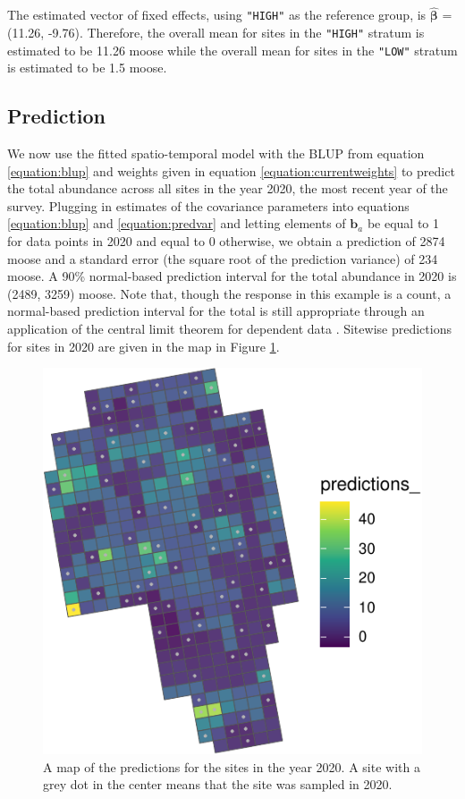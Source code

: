 \documentclass[]{interact}
\theoremstyle{plain}%
\theoremstyle{definition}
\theoremstyle{remark}
\begin{document}
The estimated vector of fixed effects, using \texttt{"HIGH"} as the
reference group, is \(\bm{\hat{\beta}}\) = (11.26, -9.76). Therefore,
the overall mean for sites in the \texttt{"HIGH"} stratum is estimated
to be 11.26 moose while the overall mean for sites in the \texttt{"LOW"}
stratum is estimated to be 1.5 moose.

\subsection{Prediction}

We now use the fitted spatio-temporal model with the BLUP from equation
\ref{equation:blup} and weights given in equation
\ref{equation:currentweights} to predict the total abundance across all
sites in the year 2020, the most recent year of the survey. Plugging in
estimates of the covariance parameters into equations
\ref{equation:blup} and \ref{equation:predvar} and letting elements of
\(\mathbf{b}_a\) be equal to 1 for data points in 2020 and equal to 0
otherwise, we obtain a prediction of 2874 moose and a standard error
(the square root of the prediction variance) of 234 moose. A 90\%
normal-based prediction interval for the total abundance in 2020 is
(2489, 3259) moose. Note that, though the response in this example is a
count, a normal-based prediction interval for the total is still
appropriate through an application of the central limit theorem for
dependent data \citep{smith1980central}. Sitewise predictions for sites
in 2020 are given in the map in Figure \ref{fig:sitepredmap}.

\begin{figure}
\centering
\includegraphics{fpspatiotemp_manu_files/figure-latex/unnamed-chunk-9-1.pdf}
\caption{\label{fig:sitepredmap} A map of the predictions for the sites
in the year 2020. A site with a grey dot in the center means that the
site was sampled in 2020.}
\end{figure}
\end{document}
